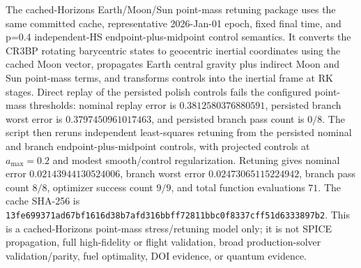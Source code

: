 \documentclass[11pt]{article}
\begin{document}
The cached-Horizons Earth/Moon/Sun point-mass retuning package uses the same committed cache, representative 2026-Jan-01 epoch, fixed final time, and p=0.4 independent-HS endpoint-plus-midpoint control semantics. It converts the CR3BP rotating barycentric states to geocentric inertial coordinates using the cached Moon vector, propagates Earth central gravity plus indirect Moon and Sun point-mass terms, and transforms controls into the inertial frame at RK stages. Direct replay of the persisted polish controls fails the configured point-mass thresholds: nominal replay error is $0.3812580376880591$, persisted branch worst error is $0.3797450961017463$, and persisted branch pass count is $0/8$. The script then reruns independent least-squares retuning from the persisted nominal and branch endpoint-plus-midpoint controls, with projected controls at $a_{\max}=0.2$ and modest smooth/control regularization. Retuning gives nominal error $0.02143944130524006$, branch worst error $0.02473065115224942$, branch pass count $8/8$, optimizer success count $9/9$, and total function evaluations $71$. The cache SHA-256 is \texttt{13fe699371ad67bf1616d38b7afd316bbff72811bbc0f8337cff51d6333897b2}. This is a cached-Horizons point-mass stress/retuning model only; it is not SPICE propagation, full high-fidelity or flight validation, broad production-solver validation/parity, fuel optimality, DOI evidence, or quantum evidence.

\begin{table}[htbp]
\centering
\caption{Independent-HS cached-Horizons Earth/Moon/Sun point-mass retuning at a representative 2026-Jan-01 epoch. Persisted controls fail direct replay under the point-mass model, but independent retuning restores nominal and all 8 branch checks below the configured thresholds. This is retuning evidence, not SPICE/high-fidelity validation or broad production-solver validation/parity.}
\label{tab:supp_independent_hs_horizons_point_mass_retuning}
\resizebox{\textwidth}{!}{}
\end{table}
\end{document}
